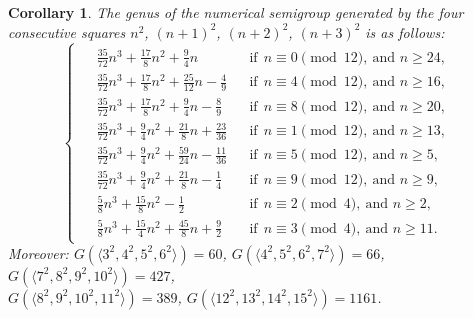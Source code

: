 \documentclass[12pt]{article}
\newtheorem{cor}[thm]{Corollary}
\theoremstyle{remark}
\begin{document}
\begin{cor}\label{corgenussquares}
The genus of the numerical semigroup generated by the four consecutive squares $n^2$, $(n+1)^2$, $(n+2)^2$, $(n+3)^2$ is as follows:
$$
\begin{cases}
\begin{aligned}
&\frac{35}{72} n^3 + \frac{17}{8} n^2 + \frac{9}{4} n
    &&\text{if} \ \ n \equiv 0 \pmod{12},\ \text{and } n \ge 24,\\
&\frac{35}{72} n^3 + \frac{17}{8} n^2 + \frac{25}{12} n - \frac{4}{9}
    &&\text{if} \ \ n \equiv 4 \pmod{12},\ \text{and } n \ge 16,\\
&\frac{35}{72} n^3 + \frac{17}{8} n^2 + \frac{9}{4} n - \frac{8}{9}
    &&\text{if} \ \ n \equiv 8 \pmod{12},\ \text{and } n \ge 20,\\
&\frac{35}{72} n^3 + \frac{9}{4} n^2 + \frac{21}{8} n + \frac{23}{36}
    &&\text{if} \ \ n \equiv 1 \pmod{12},\ \text{and } n \ge 13,\\
&\frac{35}{72} n^3 + \frac{9}{4} n^2 + \frac{59}{24} n - \frac{11}{36}
    &&\text{if} \ \ n \equiv 5 \pmod{12},\ \text{and } n \ge 5,\\
&\frac{35}{72} n^3 + \frac{9}{4} n^2 + \frac{21}{8} n - \frac{1}{4}
    &&\text{if} \ \ n \equiv 9 \pmod{12},\ \text{and } n \ge 9,\\
&\frac{5}{8} n^3 + \frac{15}{8} n^2 - \frac{1}{2}
    &&\text{if} \ \ n \equiv 2 \pmod{4},\ \text{and } n \ge 2,\\
&\frac{5}{8} n^3 + \frac{15}{4} n^2 + \frac{45}{8} n + \frac{9}{2}
    &&\text{if} \ \ n \equiv 3 \pmod{4},\ \text{and } n \ge 11.
\end{aligned}
\end{cases}
    $$
Moreover:  $G(\langle 3^2,4^2,5^2,6^2 \rangle) = 60$,
$ G(\langle 4^2,5^2,6^2,7^2 \rangle) = 66$, 
$G(\langle 7^2,8^2,9^2,10^2 \rangle) = 427$, \\ 
$G(\langle 8^2,9^2,10^2,11^2 \rangle) =  389$,
$ G(\langle12^2,13^2,14^2,15^2 \rangle) = 1161$.
\end{cor}
\end{document}
